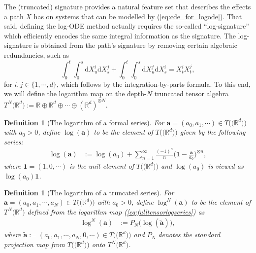 \documentclass{article}
\newcommand{\R}{\mathbb{R}}
\newtheorem{definition}[theorem]{Definition}
\newcommand{\dby}{\mathrm{d}}
\begin{document}
The (truncated) signature provides a natural feature set that describes the effects a path $X$ has on systems that can be modelled by (\ref{eq:cde_for_logode}). That said, defining the log-ODE method actually requires the so-called ``log-signature'' which efficiently encodes the same integral information as the signature. The log-signature is obtained from the path's signature by removing certain algebraic redundancies, such as
\begin{equation}
\int_0^t\int_0^s \dby X_u^{i} \dby X_s^{j} + \int_0^t\int_0^s \dby X_u^{j} \dby X_s^{i} = X_t^{i}X_t^{j},
\nonumber
\end{equation}
for $i,j\in\{1,\cdots, d\}$, which follows by the integration-by-parts formula. To this end, we will define the logarithm map on the depth-$N$ truncated tensor algebra $T^N\big(\R^d\big):= \R \oplus \R^d\oplus\cdots\oplus (\R^d)^{\otimes N}$.

\begin{definition}[The logarithm of a formal series]\label{def:tensor_log} For $\boldsymbol{a} = (a_{0}, a_{1}, \cdots) \in T\big(\big(\R^{d}\big)\big)$ with $a_{0} > 0$, define $\log(\boldsymbol{a})$ to be the element of $T\big(\big(\R^{d}\big)\big)$ given by the following series:
\begin{align}
\log(\boldsymbol{a}) & := \log(a_{0}) + \sum_{n=1}^{\infty}\frac{(-1)^{n}}{n}\bigg(\boldsymbol{1} - \frac{\boldsymbol{a}}{a_{0}}\bigg)^{\otimes n},\label{eq:fulltensorlogseries}
\end{align}
where $\boldsymbol{1} = (1, 0, \cdots)$ is the unit element of $T\big(\big(\R^{d}\big)\big)$ and $\log(a_{0})$ is viewed as $\log(a_{0})\boldsymbol{1}$.
\end{definition}
\begin{definition}[The logarithm of a truncated series] For $\boldsymbol{a} = (a_{0}, a_{1}, \cdots, a_N) \in T\big(\big(\R^{d}\big)\big)$ with $a_{0} > 0$, define $\log^N(\boldsymbol{a})$ to be the element of $T^N\big(\R^d\big)$ defined from the logarithm map (\ref{eq:fulltensorlogseries}) as
\begin{align}
\log^N(\boldsymbol{a})  & := P_N\big(\log(\boldsymbol{\widetilde{a}})\big),\label{eq:trunctensorlogseries}
\end{align}
where $\boldsymbol{\widetilde{a}} := (a_{0}, a_{1}, \cdots, a_N, 0, \cdots)\in T\big(\big(\R^{d}\big)\big)$ and $P_N$ denotes the standard projection map from $T\big(\big(\R^{d}\big)\big)$ onto $T^N\big(\R^d\big)$.
\end{definition}
\end{document}
